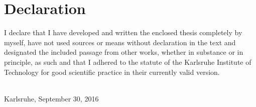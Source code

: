\thispagestyle{empty}


\vspace*{8cm}


\section*{Declaration}

 I declare that I have developed and written the enclosed thesis completely by myself, have not used sources or means without declaration in the text and designated the included passage from other works, whether in substance or in principle, as such and that I adhered to the statute of the Karlsruhe Institute of Technology for good scientific practice in their currently valid version.


~\\[2ex] 
\noindent
Karlsruhe, September 30, 2016
~\\[5ex]
